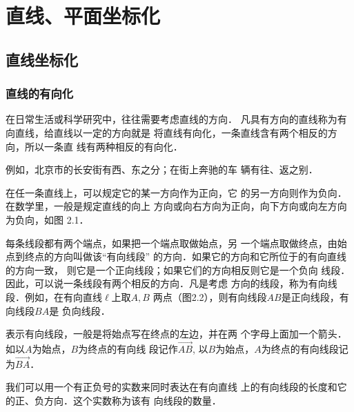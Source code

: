 \chapter{直线、平面坐标化}
\section{直线坐标化}

\subsection{直线的有向化}
在日常生活或科学研究中，往往需要考虑直线的方向．
凡具有方向的直线称为有向直线，给直线以一定的方向就是
将直线有向化，一条直线含有两个相反的方向，所以一条直
线有两种相反的有向化．

例如，北京市的长安街有西、东之分；在街上奔驰的车
辆有往、返之别．

在任一条直线上，可以规定它的某一方向作为正向，它
的另一方向则作为负向．在数学里，一般是规定直线的向上
方向或向右方向为正向，向下方向或向左方向为负向，如图
2.1．
\begin{figure}[htp]
    \centering
{}
    \caption{}
\end{figure}

每条线段都有两个端点，如果把一个端点取做始点，另
一个端点取做终点，由始点到终点的方向叫做该“有向线段”
的方向．如果它的方向和它所位于的有向直线的方向一致，
则它是一个正向线段；如果它们的方向相反则它是一个负向
线段．因此，可以说一条线段有两个相反的方向．凡是考虑
方向的线段，称为有向线段．例如，在有向直线$\ell$上取$A,B$
两点（图2.2），则有向线段$AB$是正向线段，有向线段$BA$是
负向线段．
\begin{figure}[htp]
    \centering
{}
    \caption{}
\end{figure}

表示有向线段，一般是将始点写在终点的左边，并在两
个字母上面加一个箭头．如以$A$为始点，$B$为终点的有向线
段记作$\Vec{AB}$, 以$B$为始点，$A$为终点的有向线段记为$\Vec{BA}$．

我们可以用一个有正负号的实数来同时表达在有向直线
上的有向线段的长度和它的正、负方向．这个实数称为该有
向线段的数量．

